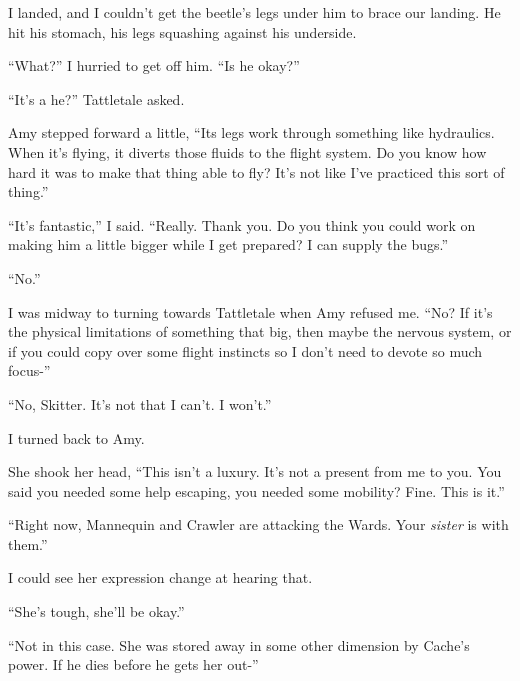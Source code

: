 I landed, and I couldn't get the beetle's legs under him to brace our landing.  He hit his stomach, his legs squashing against his underside.



``What?'' I hurried to get off him.  ``Is he okay?''



``It's a he?''  Tattletale asked.



Amy stepped forward a little, ``Its legs work through something like hydraulics.  When it's flying, it diverts those fluids to the flight system.  Do you know how hard it was to make that thing able to fly?  It's not like I've practiced this sort of thing.''



``It's fantastic,'' I said.  ``Really.  Thank you.  Do you think you could work on making him a little bigger while I get prepared?  I can supply the bugs.''



``No.''



I was midway to turning towards Tattletale when Amy refused me.  ``No?  If it's the physical limitations of something that big, then maybe the nervous system, or if you could copy over some flight instincts so I don't need to devote so much focus-''



``No, Skitter.  It's not that I can't.  I won't.''



I turned back to Amy.



She shook her head, ``This isn't a luxury.  It's not a present from me to you.  You said you needed some help escaping, you needed some mobility?  Fine.  This is it.''



``Right now, Mannequin and Crawler are attacking the Wards.  Your \emph{sister} is with them.''



I could see her expression change at hearing that.



``She's tough, she'll be okay.''



``Not in this case.  She was stored away in some other dimension by Cache's power.  If he dies before he gets her out-''



